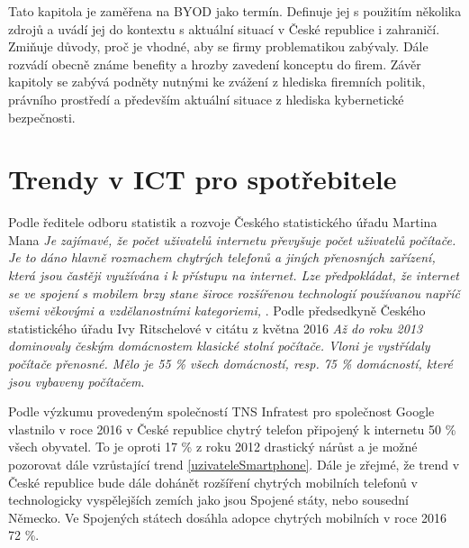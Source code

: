Tato kapitola je zaměřena na BYOD jako termín. Definuje jej s použitím několika zdrojů a uvádí jej do kontextu s aktuální situací v České republice i zahraničí. Zmiňuje důvody, proč je vhodné, aby se firmy problematikou zabývaly. Dále rozvádí obecně známe benefity a hrozby zavedení konceptu do firem. Závěr kapitoly se zabývá podněty nutnými ke zvážení z hlediska firemních politik, právního prostředí a především aktuální situace z hlediska kybernetické bezpečnosti.  

\section{Trendy v ICT pro spotřebitele}\label{trendy} 

Podle ředitele odboru statistik a rozvoje Českého statistického úřadu Martina Mana \textit{Je zajímavé, že počet uživatelů internetu převyšuje počet uživatelů počítače. Je to dáno hlavně rozmachem chytrých telefonů a jiných přenosných zařízení, která jsou častěji využívána i k přístupu na internet. Lze předpokládat, že internet se ve spojení s mobilem brzy stane široce rozšířenou technologií používanou napříč všemi věkovými a vzdělanostními  kategoriemi,} . Podle předsedkyně Českého statistického úřadu Ivy Ritschelové v citátu z května 2016 \textit{Až do roku 2013 dominovaly českým domácnostem klasické stolní počítače. Vloni je vystřídaly počítače přenosné. Mělo je 55 \% všech domácností, resp. 75 \% domácností, které jsou vybaveny počítačem}.

Podle výzkumu provedeným společností TNS Infratest pro společnost Google vlastnilo v roce 2016 v České republice chytrý telefon připojený k internetu 50 \% všech obyvatel.   To je oproti 17 \% z roku 2012 drastický nárůst a je možné pozorovat dále vzrůstající trend \ref{uzivateleSmartphone}. Dále je zřejmé, že trend v České republice bude dále dohánět rozšíření chytrých mobilních telefonů v technologicky vyspělejších zemích jako jsou Spojené státy, nebo sousední Německo. Ve Spojených státech dosáhla adopce chytrých mobilních v roce 2016 72 \%.

